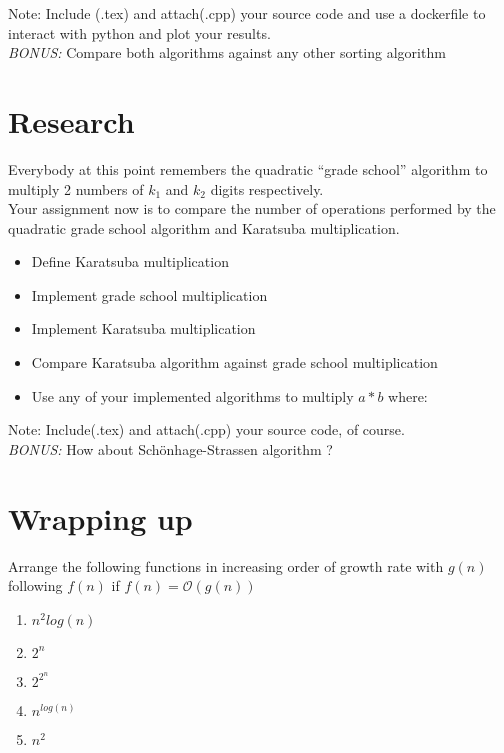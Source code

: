 \documentclass[12pt]{article}
\begin{document}
Note: Include (.tex) and attach(.cpp) your source code and use a dockerfile to interact with python and plot your results.\\

\emph{BONUS:} Compare both algorithms against any other sorting algorithm

\section{Research}

Everybody at this point remembers the quadratic ``grade school'' algorithm to multiply 2 numbers of $k_{1}$ and $k_{2}$ digits respectively. \\

Your assignment now is to compare the number of operations performed by the quadratic grade school algorithm and Karatsuba multiplication.

\begin{itemize}
    \item Define Karatsuba multiplication
    \item Implement grade school multiplication
    \item Implement Karatsuba multiplication
    \item Compare Karatsuba algorithm against grade school multiplication
    \item Use any of your implemented algorithms to multiply $a*b$ where:
\end{itemize}

Note: Include(.tex) and attach(.cpp) your source code, of course.\\

\emph{BONUS:} How about Sch\"{o}nhage-Strassen algorithm ? 

\section{Wrapping up}

Arrange the following functions in increasing order of growth rate with $g(n)$ following $f(n)$ if $f(n) = \mathcal{O}(g(n))$

\begin{enumerate}
    \item $n^{2}log(n)$
    \item $2^{n}$
    \item $2^{2^{n}}$
    \item $n^{log(n)}$
    \item $n^{2}$
\end{enumerate}
\end{document}
